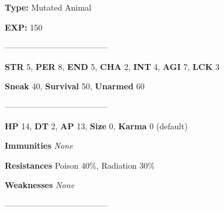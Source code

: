 \documentclass[11pt,a4paper,twocolumn]{book}
\begin{document}
%	
%	
%		
%	
%		

	\noindent
	\textbf{Type:} Mutated Animal

	\noindent
	\textbf{EXP:} 150
	
	--------------------------------------
	
	\noindent
	\textbf{STR} 5, \textbf{PER} 8, \textbf{END} 5, \textbf{CHA} 2, \textbf{INT} 4, \textbf{AGI} 7, \textbf{LCK} 3
	
	\noindent
	\textbf{Sneak} 40, \textbf{Survival} 50, \textbf{Unarmed} 60
	
	--------------------------------------
	
	\noindent
	\textbf{HP} 14, \textbf{DT} 2, \textbf{AP} 13, \textbf{Size} 0, \textbf{Karma} 0 (default)
	
	
	\noindent
	\textbf{Immunities} \emph{None}
	
	\noindent
	\textbf{Resistances} Poison 40\%, Radiation 30\%
	
	\noindent
	\textbf{Weaknesses} \emph{None} %
	
	--------------------------------------
	
\end{document}
